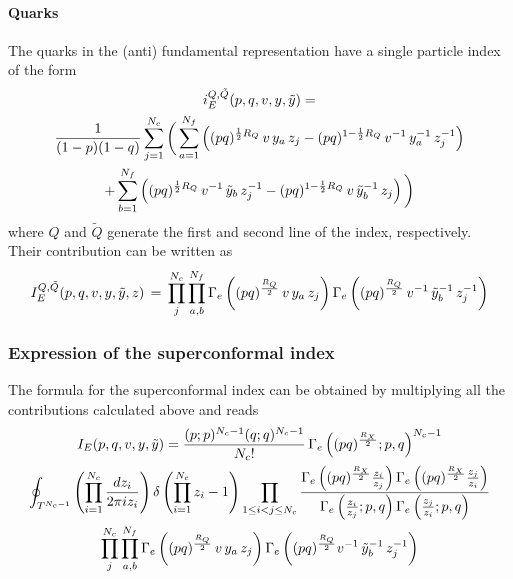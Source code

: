 \paragraph{Quarks}
The quarks in the (anti) fundamental representation have a single particle index of the form
\begin{multline}
i_E^{Q,\tilde{Q}} (p,q,v,y,\tilde{y})=\\ 
{1\over (1-p)(1-q)} \sum_{j=1}^{N_c}
\bigg(  \sum_{a=1}^{N_f} \left(  
(p q)^{{1\over 2}R_Q} \, v \, y_a \, z_j
- (p q)^{1- {1\over 2} R_Q} \, v^{-1} \, y_a^{-1} \, z_j^{-1} \right)\\
 +
 \sum_{b=1}^{N_f} \left(  
(p q)^{{1\over 2}R_Q}\, v^{-1}\, {\tilde y}_b \,z_j^{-1}
- (p q)^{1- {1\over 2}R_Q} \, v\, {\tilde y_b}^{-1}\, z_j \right)\bigg) 
\end{multline}
where $Q$ and $\tilde{Q} $ generate the first and second line of the index, respectively.\\
Their contribution can be written as
\begin{equation}
I_E^{Q,\tilde{Q}} ( p ,q,v,y,\tilde{y},z) \, = \, \prod_{ j}^{ N_c} \prod_{ a,b}^{N_f} \Gamma_e \left( (pq)^{R_Q \over 2} \, v  \,  y_a \,  z_j \right)
\Gamma_e \left( (pq)^{R_Q \over 2}\,  v^{-1} \,  {\tilde y_b}^{-1}\,  z_j^{-1}\right)
\end{equation}
\subsubsection{Expression of the superconformal index }
The formula for the superconformal index can be obtained by multiplying all the contributions calculated above and reads
\begin{multline}
I_{E} ( p,q,v,y,\tilde y ) = 
  \frac{ (p;p)^{N_c-1} ( q;q)^{N_c-1} }{ N_c !} \, \Gamma_e \left(   (pq)^\frac{R_X}{2};p,q\right)^{N_c-1} \\
\oint_{T^{N_c-1}} \left( \prod_{i=1}^{N_c } { d z_i \over { 2 \pi i z_i} } \right) \delta \left( \prod_{i=1}^{N_c} z_i - 1 \right)
\prod_{ 1 \leq i < j \leq N_c} \frac{ \Gamma_e \left( (pq)^\frac{R_X}{2} {z_i \over z_j} \right) \Gamma_e \left( (pq)^\frac{R_X}{2} {z_j \over z_i} \right) }{ \Gamma_e \left( {z_i \over z_j};p,q \right) \Gamma_e \left({z_j \over z_i}; p,q \right)} \\
 \prod_{ j}^{  N_c} \prod_{ a,b}^{ N_f} \Gamma_e \left( (pq)^{R_Q \over 2} \, v \,  y_a \,  z_j \right)
\Gamma_e \left( (pq)^{R_Q \over 2} v^{-1} \, \tilde {y}_b^{-1}\,  z_j^{-1}\right)
\end{multline}

